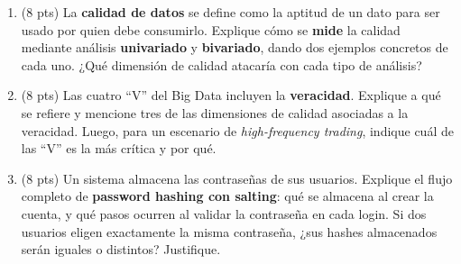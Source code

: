 \documentclass[11pt,a4paper]{article}
\begin{document}
\begin{enumerate}
  \item (8 pts) La \textbf{calidad de datos} se define como la aptitud de un dato para ser usado por quien debe consumirlo. Explique cómo se \textbf{mide} la calidad mediante análisis \textbf{univariado} y \textbf{bivariado}, dando dos ejemplos concretos de cada uno. ¿Qué dimensión de calidad atacaría con cada tipo de análisis?

  \vspace{5cm}

  \item (8 pts) Las cuatro ``V'' del Big Data incluyen la \textbf{veracidad}. Explique a qué se refiere y mencione tres de las dimensiones de calidad asociadas a la veracidad. Luego, para un escenario de \textit{high-frequency trading}, indique cuál de las ``V'' es la más crítica y por qué.

  \vspace{5cm}

  \item (8 pts) Un sistema almacena las contraseñas de sus usuarios. Explique el flujo completo de \textbf{password hashing con salting}: qué se almacena al crear la cuenta, y qué pasos ocurren al validar la contraseña en cada login. Si dos usuarios eligen exactamente la misma contraseña, ¿sus hashes almacenados serán iguales o distintos? Justifique.

  \vspace{5cm}
\end{enumerate}
\end{document}
